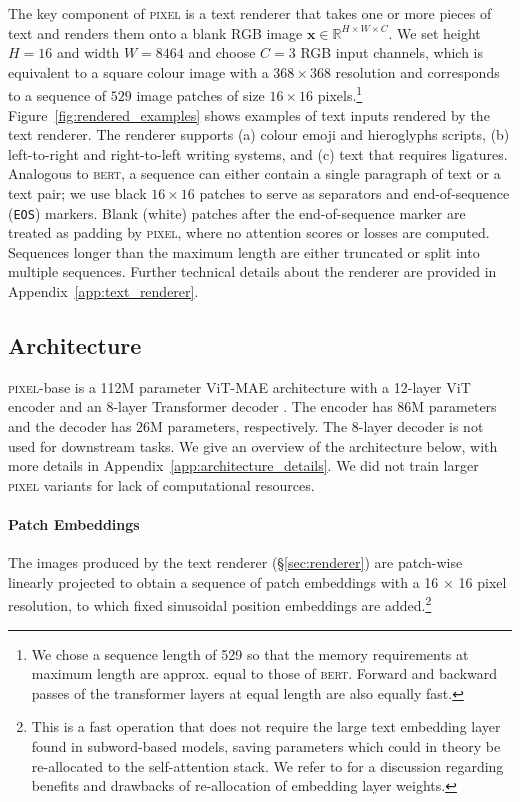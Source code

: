\documentclass{article}
\newcommand{\model}{\textsc{pixel}\xspace}
\begin{document}
The key component of \model is a text renderer that takes one or more pieces of text and renders them onto a blank RGB image $\bm{x} \in \mathbb{R}^{H \times W \times C}$. We set height $H=16$ and width $W=8464$ and choose $C=3$ RGB input channels, which is equivalent to a square colour image with a $368\times368$ resolution and corresponds to a sequence of $529$ image patches of size $16 \times 16$ pixels.\footnote{We chose a sequence length of 529 so that the memory requirements at maximum length are approx. equal to those of \textsc{bert}. Forward and backward passes of the transformer layers at equal length are also equally fast.}
Figure~\ref{fig:rendered_examples} shows examples of text inputs
rendered by the text renderer. 
The renderer supports (a) colour emoji and hieroglyphs scripts, (b) left-to-right and right-to-left writing systems, and (c) text that requires ligatures.  Analogous to \textsc{bert}, a sequence can either contain a single paragraph of text or a text pair; we use black $16 \times 16$ patches to serve as separators and end-of-sequence ({\footnotesize\texttt{EOS}}) markers. Blank (white) patches after the end-of-sequence marker are treated as padding by \model, where no attention scores or losses are computed. Sequences longer than the maximum length are either truncated or split into multiple sequences. Further technical details about the renderer are provided in Appendix~\ref{app:text_renderer}.

\vspace{-2mm}
\subsection{Architecture}
\vspace{-2mm}

\model-base is a 112M parameter ViT-MAE architecture \citep{he-etal-2022-mae} with a 12-layer ViT encoder \citep{dosovitskiy2021an} and an 8-layer Transformer decoder \citep{DBLP:conf/nips/VaswaniSPUJGKP17}. The encoder has $86$M parameters and the decoder has $26$M parameters, respectively. The 8-layer decoder is not used for downstream tasks. We give an overview of the architecture below, with more details in Appendix~\ref{app:architecture_details}. We did not train larger \model variants for lack of computational resources.

\vspace{-2mm}
\paragraph{Patch Embeddings} The images produced by the text renderer (\S\ref{sec:renderer}) are patch-wise linearly projected to obtain a sequence of patch embeddings with a 16 $\times$ 16 pixel resolution, to which fixed sinusoidal position embeddings are added.\footnote{This is a fast operation that does not require the large text embedding layer found in subword-based models, saving parameters which could in theory be re-allocated to the self-attention stack. We refer to \citet{xue-etal-2022-byt5} for a discussion regarding benefits and drawbacks of re-allocation of embedding layer weights.}
\end{document}
